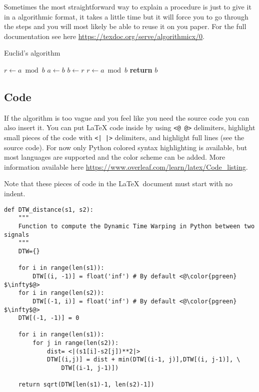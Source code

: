 \documentclass{project-logbook}
\begin{document}
		\begin{HighlightedNote}{}
			Sometimes the most straightforward way to explain a procedure is just to give it in a algorithmic format, it takes a little time but it will force you to go through the steps and you will most likely be able to reuse it on you paper. For the full documentation see here \url{https://texdoc.org/serve/algorithmicx/0}.
		\end{HighlightedNote}

		\begin{algorithm}
			\caption{Euclid’s algorithm}\label{alg:euclid}
			\begin{algorithmic}[1]
					\State $r\gets a\bmod b$
						\State $a\gets b$
						\State $b\gets r$
						\State $r\gets a\bmod b$
					\EndWhile\label{euclidendwhile}
					\State \textbf{return} $b$
				\EndProcedure
			\end{algorithmic}
		\end{algorithm}


	\subsection{Code} \label{sub:code}
		\begin{HighlightedNote}{}
			If the algorithm is too vague and you feel like you need the source code you can also insert it. You can put LaTeX code inside by using \texttt{<@ @>} delimiters, highlight small pieces of the code with \texttt{<| |>} delimiters, and highlight full lines (see the source code). For now only Python colored syntax highlighting is available, but most languages are supported and the color scheme can be added. More information available here \url{https://www.overleaf.com/learn/latex/Code_listing}.

			Note that these pieces of code in the \LaTeX~document must start with no indent.
		\end{HighlightedNote}

\begin{lstlisting}[style=Python, linebackgroundcolor={
	\ifnum \value{lstnumber}=8 \color{orange!30} \fi
	\ifnum \value{lstnumber}=10 \color{orange!30} \fi
	\ifnum \value{lstnumber}=17 \color{orange!30}\fi
	\ifnum \value{lstnumber}=18 \color{orange!30}\fi}]
def DTW_distance(s1, s2):
	"""
	Function to compute the Dynamic Time Warping in Python between two signals
	"""
	DTW={}

	for i in range(len(s1)):
		DTW[(i, -1)] = float('inf') # By default <@\color{pgreen} $\infty$@>
	for i in range(len(s2)):
		DTW[(-1, i)] = float('inf') # By default <@\color{pgreen} $\infty$@>
	DTW[(-1, -1)] = 0

	for i in range(len(s1)):
		for j in range(len(s2)):
			dist= <|(s1[i]-s2[j])**2|>
			DTW[(i,j)] = dist + min(DTW[(i-1, j)],DTW[(i, j-1)], \
				DTW[(i-1, j-1)])

	return sqrt(DTW[len(s1)-1, len(s2)-1])
\end{lstlisting}
\end{document}
